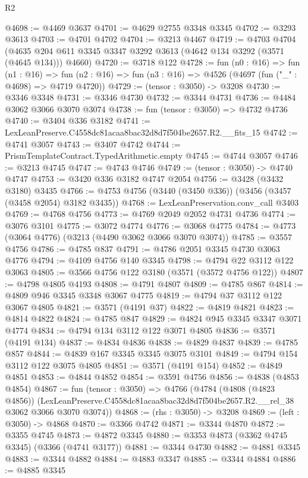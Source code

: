 \begin{lexlean}{R2}
\begin{coremodule}
@4698 := @4469 @3637
@4701 := @4629 @2755 @3348 @3345
@4702 := @3293 @3613
@4703 := @4701 @4702
@4704 := @3213 @4467
@4719 := @4703
    @4704
    (@4635 @204 @611 @3345 @3347 @3292 @3613 (@4642 @134 @3292 (@3571 (@4645 @134))) @4660)
@4720 := @3718 @122
@4728 := fun (n0 : @16) =>
  fun (n1 : @16) =>
  fun (n2 : @16) => fun (n3 : @16) => @4526 (@4697 (fun ("_" : @4698) => @4719 @4720))
@4729 := (tensor : @3050) -> @3208
@4730 := @3346 @3348
@4731 := @3346 @4730
@4732 := @3344 @4731
@4736 := @4484 @3062 @3066 @3070 @3074
@4738 := fun (tensor : @3050) => @4732 @4736
@4740 := @3404 @336 @3182
@4741 := LexLeanPreserve.C4558dc81acaa8bac32d8d7f504be2657.R2.__fits_15
@4742 := @4741 @3057
@4743 := @3407 @4742
@4744 := PrismTemplateContract.TypedArithmetic.empty
@4745 := @4744 @3057
@4746 := @3213 @4745
@4747 := @4743 @4746
@4749 := (tensor : @3050) -> @4740 @4747
@4753 := @3420 @336 @3182 @4747 @2054
@4756 := @3428 (@3432 @3180) @3435
@4766 := @4753 @4756 (@3440 (@3450 @336)) (@3456 (@3457 (@3458 @2054) @3182 @3435))
@4768 := LexLeanPreservation.conv_call @3403
@4769 := @4768 @4756
@4773 := @4769 @2049 @2052 @4731 @4736
@4774 := @3076 @3101
@4775 := @3072 @4774
@4776 := @3068 @4775
@4784 := @4773 (@3064 @4776) (@3213 (@4490 @3062 @3066 @3070 @3074))
@4785 := @3557 @4756
@4786 := @4785 @837
@4791 := @4786 @2051 @3345 @4730 @3063 @4776
@4794 := @4109 @4756 @140 @3345
@4798 := @4794 @22 @3112 @122 @3063
@4805 := @3566 @4756 @122 @3180 (@3571 (@3572 @4756 @122))
@4807 := @4798 @4805 @4193
@4808 := @4791 @4807
@4809 := @4785 @867
@4814 := @4809 @946 @3345 @3348 @3067 @4775
@4819 := @4794 @37 @3112 @122 @3067 @4805
@4821 := @3571 (@4191 @37)
@4822 := @4819 @4821
@4823 := @4814 @4822
@4824 := @4785 @847
@4829 := @4824 @945 @3345 @3347 @3071 @4774
@4834 := @4794 @134 @3112 @122 @3071 @4805
@4836 := @3571 (@4191 @134)
@4837 := @4834 @4836
@4838 := @4829 @4837
@4839 := @4785 @857
@4844 := @4839 @167 @3345 @3345 @3075 @3101
@4849 := @4794 @154 @3112 @122 @3075 @4805
@4851 := @3571 (@4191 @154)
@4852 := @4849 @4851
@4853 := @4844 @4852
@4854 := @3591 @4756
@4856 := @4838 (@4853 @4854)
@4867 := fun (tensor : @3050) =>
  @4766
    (@4784
      (@4808 (@4823 @4856))
      (LexLeanPreserve.C4558dc81acaa8bac32d8d7f504be2657.R2.__rel_38 @3062 @3066 @3070 @3074))
@4868 := (rhs : @3050) -> @3208
@4869 := (left : @3050) -> @4868
@4870 := @3366 @4742
@4871 := @3344 @4870
@4872 := @3355 @4745
@4873 := @4872 @3345
@4880 := @3353 @4873 (@3362 @4745 @3345) (@3366 (@4741 @3177))
@4881 := @3344 @4730
@4882 := @4881 @3345
@4883 := @3344 @4882
@4884 := @4883 @3347
@4885 := @3344 @4884
@4886 := @4885 @3345

\end{coremodule}
\end{lexlean}
